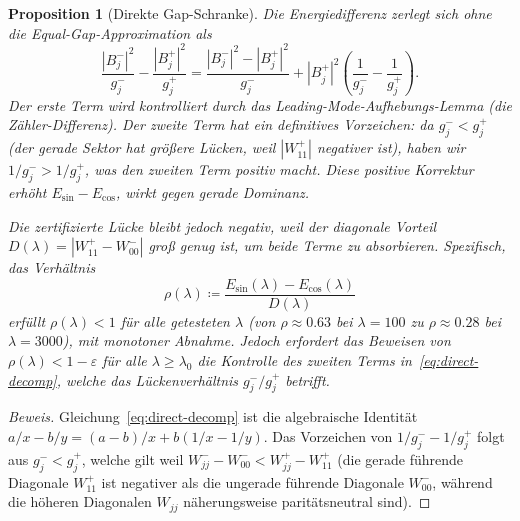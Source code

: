 ﻿\documentclass[12pt,a4paper]{article}
\newtheorem{proposition}[theorem]{Proposition}
\theoremstyle{definition}
\theoremstyle{remark}
\begin{document}
\begin{proposition}[Direkte Gap-Schranke]
\label{prop:direct-gap}
Die Energiedifferenz zerlegt sich ohne die Equal-Gap-Approximation als
\begin{equation}
\label{eq:direct-decomp}
  \frac{|B_j^-|^2}{g_j^-} - \frac{|B_j^+|^2}{g_j^+}
  = \frac{|B_j^-|^2 - |B_j^+|^2}{g_j^-} + |B_j^+|^2\!\left(\frac{1}{g_j^-} - \frac{1}{g_j^+}\right).
\end{equation}
Der erste Term wird kontrolliert durch das Leading-Mode-Aufhebungs-Lemma (die Zähler-Differenz). Der zweite Term hat ein definitives Vorzeichen: da $g_j^- < g_j^+$ (der gerade Sektor hat größere Lücken, weil $|W_{11}^+|$ negativer ist), haben wir $1/g_j^- > 1/g_j^+$, was den zweiten Term \emph{positiv} macht. Diese positive Korrektur \emph{erhöht} $E_{\sin} - E_{\cos}$, wirkt \emph{gegen} gerade Dominanz.

Die zertifizierte Lücke bleibt jedoch negativ, weil der diagonale Vorteil $D(\lambda) = |W_{11}^+ - W_{00}^-|$ groß genug ist, um beide Terme zu absorbieren. Spezifisch, das Verhältnis
\[
  \rho(\lambda) \coloneqq \frac{E_{\sin}(\lambda) - E_{\cos}(\lambda)}{D(\lambda)}
\]
erfüllt $\rho(\lambda) < 1$ für alle getesteten $\lambda$ (von $\rho \approx 0.63$ bei $\lambda = 100$ zu $\rho \approx 0.28$ bei $\lambda = 3000$), mit monotoner Abnahme. Jedoch erfordert das Beweisen von $\rho(\lambda) < 1 - \varepsilon$ für alle $\lambda \geq \lambda_0$ die Kontrolle des zweiten Terms in~\eqref{eq:direct-decomp}, welche das Lückenverhältnis $g_j^-/g_j^+$ betrifft.
\end{proposition}

\begin{proof}[Beweis]
Gleichung~\eqref{eq:direct-decomp} ist die algebraische Identität $a/x - b/y = (a-b)/x + b(1/x - 1/y)$. Das Vorzeichen von $1/g_j^- - 1/g_j^+$ folgt aus $g_j^- < g_j^+$, welche gilt weil $W_{jj}^- - W_{00}^- < W_{jj}^+ - W_{11}^+$ (die gerade führende Diagonale $W_{11}^+$ ist negativer als die ungerade führende Diagonale $W_{00}^-$, während die höheren Diagonalen $W_{jj}$ näherungsweise paritätsneutral sind).
\end{proof}
\end{document}
